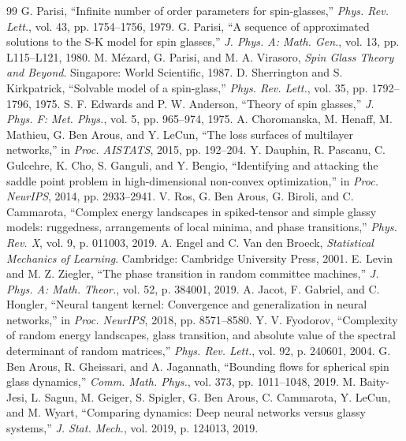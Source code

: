 \documentclass[12pt,a4paper]{article}
\begin{document}
\begin{thebibliography}{99}
G. Parisi, ``Infinite number of order parameters for spin-glasses,'' \emph{Phys. Rev. Lett.}, vol. 43, pp. 1754--1756, 1979.
G. Parisi, ``A sequence of approximated solutions to the S-K model for spin glasses,'' \emph{J. Phys. A: Math. Gen.}, vol. 13, pp. L115--L121, 1980.
M. M\'ezard, G. Parisi, and M. A. Virasoro, \emph{Spin Glass Theory and Beyond}. Singapore: World Scientific, 1987.
D. Sherrington and S. Kirkpatrick, ``Solvable model of a spin-glass,'' \emph{Phys. Rev. Lett.}, vol. 35, pp. 1792--1796, 1975.
S. F. Edwards and P. W. Anderson, ``Theory of spin glasses,'' \emph{J. Phys. F: Met. Phys.}, vol. 5, pp. 965--974, 1975.
A. Choromanska, M. Henaff, M. Mathieu, G. Ben Arous, and Y. LeCun, ``The loss surfaces of multilayer networks,'' in \emph{Proc. AISTATS}, 2015, pp. 192--204.
Y. Dauphin, R. Pascanu, C. Gulcehre, K. Cho, S. Ganguli, and Y. Bengio, ``Identifying and attacking the saddle point problem in high-dimensional non-convex optimization,'' in \emph{Proc. NeurIPS}, 2014, pp. 2933--2941.
V. Ros, G. Ben Arous, G. Biroli, and C. Cammarota, ``Complex energy landscapes in spiked-tensor and simple glassy models: ruggedness, arrangements of local minima, and phase transitions,'' \emph{Phys. Rev. X}, vol. 9, p. 011003, 2019.
A. Engel and C. Van den Broeck, \emph{Statistical Mechanics of Learning}. Cambridge: Cambridge University Press, 2001.
E. Levin and M. Z. Ziegler, ``The phase transition in random committee machines,'' \emph{J. Phys. A: Math. Theor.}, vol. 52, p. 384001, 2019.
A. Jacot, F. Gabriel, and C. Hongler, ``Neural tangent kernel: Convergence and generalization in neural networks,'' in \emph{Proc. NeurIPS}, 2018, pp. 8571--8580.
Y. V. Fyodorov, ``Complexity of random energy landscapes, glass transition, and absolute value of the spectral determinant of random matrices,'' \emph{Phys. Rev. Lett.}, vol. 92, p. 240601, 2004.
G. Ben Arous, R. Gheissari, and A. Jagannath, ``Bounding flows for spherical spin glass dynamics,'' \emph{Comm. Math. Phys.}, vol. 373, pp. 1011--1048, 2019.
M. Baity-Jesi, L. Sagun, M. Geiger, S. Spigler, G. Ben Arous, C. Cammarota, Y. LeCun, and M. Wyart, ``Comparing dynamics: Deep neural networks versus glassy systems,'' \emph{J. Stat. Mech.}, vol. 2019, p. 124013, 2019.

\end{thebibliography}
\end{document}
